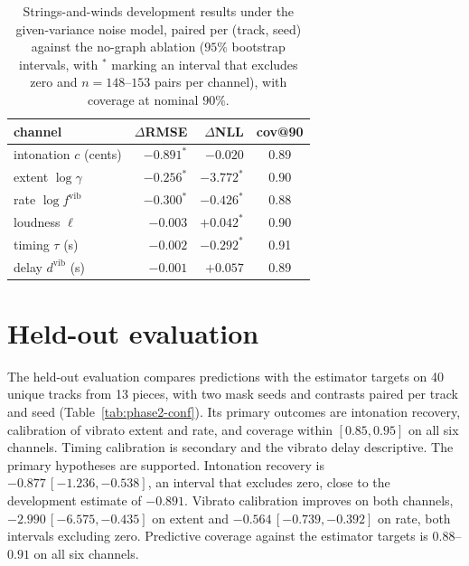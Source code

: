 \documentclass[11pt,a4paper]{report}
\begin{document}
\begin{table}[t]\centering
\caption{Strings-and-winds development results under the given-variance
noise model, paired per (track, seed) against the no-graph ablation ($95\%$
bootstrap intervals, with $^{*}$ marking an interval that excludes zero and
$n = 148$--$153$ pairs per channel), with coverage at nominal $90\%$.}
\label{tab:phase2-dev}
\footnotesize
\begin{tabular}{@{}lrrc@{}}
\toprule
channel & $\Delta$RMSE & $\Delta$NLL & cov@90 \\
\midrule
intonation $c$ (cents) & $-0.891^{*}$ & $-0.020$\phantom{$^{*}$} & 0.89 \\
extent $\log\gamma$ & $-0.256^{*}$ & $-3.772^{*}$ & 0.90 \\
rate $\log f^{\mathrm{vib}}$ & $-0.300^{*}$ & $-0.426^{*}$ & 0.88 \\
loudness $\ell$ & $-0.003$\phantom{$^{*}$} & $+0.042^{*}$ & 0.90 \\
timing $\tau$ (s) & $-0.002$\phantom{$^{*}$} & $-0.292^{*}$ & 0.91 \\
delay $d^{\mathrm{vib}}$ (s) & $-0.001$\phantom{$^{*}$} & $+0.057$\phantom{$^{*}$} & 0.89 \\
\bottomrule
\end{tabular}
\end{table}

\section{Held-out evaluation}
\label{sec:phase2-conf}
The held-out evaluation compares predictions with the estimator targets on
40 unique tracks from 13 pieces, with two mask seeds and contrasts paired
per track and seed (Table~\ref{tab:phase2-conf}). Its primary outcomes are
intonation recovery, calibration of vibrato extent and rate, and coverage
within $[0.85, 0.95]$ on all six channels. Timing calibration is secondary
and the vibrato delay descriptive. The primary hypotheses are supported.
Intonation recovery is $-0.877\,[-1.236, -0.538]$, an interval that
excludes zero, close to the development estimate of $-0.891$. Vibrato calibration
improves on both channels, $-2.990\,[-6.575, -0.435]$ on extent and
$-0.564\,[-0.739, -0.392]$ on rate, both intervals excluding zero.
Predictive coverage against the estimator targets is $0.88$--$0.91$ on all
six channels.
\end{document}
